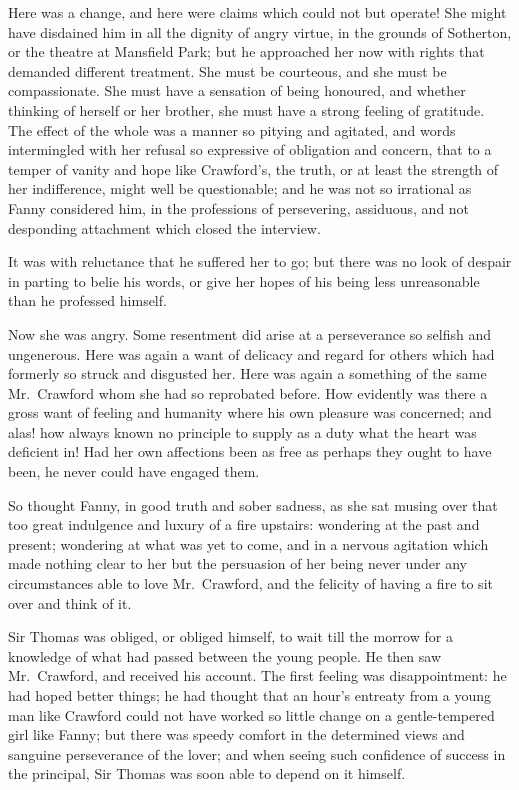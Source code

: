 \documentclass{article}
\begin{document}
Here was a change, and here were claims which could
not but operate!  She might have disdained him in all
the dignity of angry virtue, in the grounds of Sotherton,
or the theatre at Mansfield Park; but he approached
her now with rights that demanded different treatment.
She must be courteous, and she must be compassionate.
She must have a sensation of being honoured, and whether
thinking of herself or her brother, she must have a strong
feeling of gratitude.  The effect of the whole was a
manner so pitying and agitated, and words intermingled
with her refusal so expressive of obligation and concern,
that to a temper of vanity and hope like Crawford's,
the truth, or at least the strength of her indifference,
might well be questionable; and he was not so irrational
as Fanny considered him, in the professions of persevering,
assiduous, and not desponding attachment which closed
the interview.

It was with reluctance that he suffered her to go; but there
was no look of despair in parting to belie his words,
or give her hopes of his being less unreasonable than he
professed himself.

Now she was angry.  Some resentment did arise at a
perseverance so selfish and ungenerous.  Here was again
a want of delicacy and regard for others which had formerly
so struck and disgusted her.  Here was again a something
of the same Mr.\ Crawford whom she had so reprobated before.
How evidently was there a gross want of feeling and humanity
where his own pleasure was concerned; and alas! how always
known no principle to supply as a duty what the heart
was deficient in!  Had her own affections been as free
as perhaps they ought to have been, he never could have engaged
them.

So thought Fanny, in good truth and sober sadness,
as she sat musing over that too great indulgence and luxury
of a fire upstairs:  wondering at the past and present;
wondering at what was yet to come, and in a nervous
agitation which made nothing clear to her but the persuasion
of her being never under any circumstances able to love
Mr.\ Crawford, and the felicity of having a fire to sit
over and think of it.

Sir Thomas was obliged, or obliged himself, to wait till
the morrow for a knowledge of what had passed between
the young people.  He then saw Mr.\ Crawford, and received
his account.  The first feeling was disappointment:
he had hoped better things; he had thought that an hour's
entreaty from a young man like Crawford could not have worked
so little change on a gentle-tempered girl like Fanny;
but there was speedy comfort in the determined views
and sanguine perseverance of the lover; and when seeing
such confidence of success in the principal, Sir Thomas
was soon able to depend on it himself.
\end{document}
